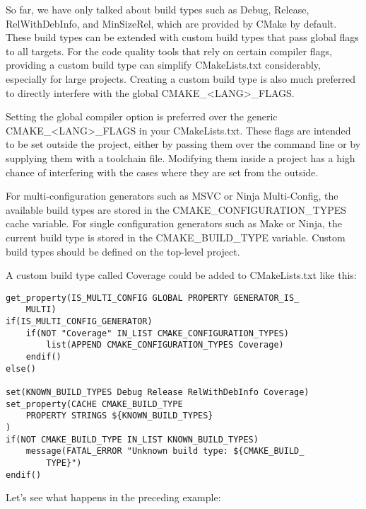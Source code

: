 So far, we have only talked about build types such as Debug, Release, RelWithDebInfo, and MinSizeRel, which are provided by CMake by default. These build types can be extended with custom build types that pass global flags to all targets. For the code quality tools that rely on certain compiler flags, providing a custom build type can simplify CMakeLists.txt considerably, especially for large projects. Creating a custom build type is also much preferred to directly interfere with the global CMAKE\_<LANG>\_FLAGS.

\begin{tcolorbox}[colback=blue!5!white,colframe=blue!75!black,title=Do Not Override CMAKE\_<LANG>\_FLAGS]
Setting the global compiler option is preferred over the generic CMAKE\_<LANG>\_FLAGS in your CMakeLists.txt. These flags are intended to be set outside the project, either by passing them over the command line or by supplying them with a toolchain file. Modifying them inside a project has a high chance of interfering with the cases where they are set from the outside.
\end{tcolorbox}

For multi-configuration generators such as MSVC or Ninja Multi-Config, the available build types are stored in the CMAKE\_CONFIGURATION\_TYPES cache variable. For single configuration generators such as Make or Ninja, the current build type is stored in the CMAKE\_BUILD\_TYPE variable. Custom build types should be defined on the top-level project.

A custom build type called Coverage could be added to CMakeLists.txt like this:

\begin{lstlisting}[style=styleCMake]
get_property(IS_MULTI_CONFIG GLOBAL PROPERTY GENERATOR_IS_
	MULTI)
if(IS_MULTI_CONFIG_GENERATOR)
	if(NOT "Coverage" IN_LIST CMAKE_CONFIGURATION_TYPES)
		list(APPEND CMAKE_CONFIGURATION_TYPES Coverage)
	endif()
else()

set(KNOWN_BUILD_TYPES Debug Release RelWithDebInfo Coverage)
set_property(CACHE CMAKE_BUILD_TYPE
	PROPERTY STRINGS ${KNOWN_BUILD_TYPES}
)
if(NOT CMAKE_BUILD_TYPE IN_LIST KNOWN_BUILD_TYPES)
	message(FATAL_ERROR "Unknown build type: ${CMAKE_BUILD_
		TYPE}")
endif()
\end{lstlisting}

Let's see what happens in the preceding example:

